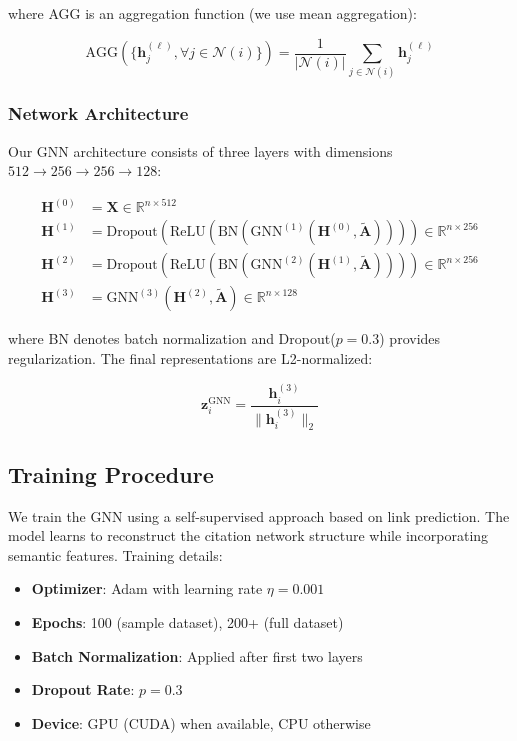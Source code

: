 \documentclass[pdflatex,sn-mathphys-num]{sn-jnl}
\theoremstyle{thmstyleone}%
\theoremstyle{thmstyletwo}%
\theoremstyle{thmstylethree}%
\begin{document}
where AGG is an aggregation function (we use mean aggregation):

\begin{equation}
    \text{AGG}\left(\{\mathbf{h}_j^{(\ell)}, \forall j \in \mathcal{N}(i)\}\right) = \frac{1}{|\mathcal{N}(i)|} \sum_{j \in \mathcal{N}(i)} \mathbf{h}_j^{(\ell)}
\end{equation}

\subsubsection{Network Architecture}

Our GNN architecture consists of three layers with dimensions $512 \to 256 \to 256 \to 128$:

\begin{align}
    \mathbf{H}^{(0)} &= \mathbf{X} \in \mathbb{R}^{n \times 512} \\
    \mathbf{H}^{(1)} &= \text{Dropout}(\text{ReLU}(\text{BN}(\text{GNN}^{(1)}(\mathbf{H}^{(0)}, \tilde{\mathbf{A}})))) \in \mathbb{R}^{n \times 256} \\
    \mathbf{H}^{(2)} &= \text{Dropout}(\text{ReLU}(\text{BN}(\text{GNN}^{(2)}(\mathbf{H}^{(1)}, \tilde{\mathbf{A}})))) \in \mathbb{R}^{n \times 256} \\
    \mathbf{H}^{(3)} &= \text{GNN}^{(3)}(\mathbf{H}^{(2)}, \tilde{\mathbf{A}}) \in \mathbb{R}^{n \times 128}
\end{align}

where BN denotes batch normalization and Dropout($p=0.3$) provides regularization. The final representations are L2-normalized:

\begin{equation}
    \mathbf{z}_i^{\text{GNN}} = \frac{\mathbf{h}_i^{(3)}}{\|\mathbf{h}_i^{(3)}\|_2}
\end{equation}

\subsection{Training Procedure}

We train the GNN using a self-supervised approach based on link prediction. The model learns to reconstruct the citation network structure while incorporating semantic features. Training details:

\begin{itemize}
    \item \textbf{Optimizer}: Adam with learning rate $\eta = 0.001$
    \item \textbf{Epochs}: 100 (sample dataset), 200+ (full dataset)
    \item \textbf{Batch Normalization}: Applied after first two layers
    \item \textbf{Dropout Rate}: $p = 0.3$
    \item \textbf{Device}: GPU (CUDA) when available, CPU otherwise
\end{itemize}
\end{document}
